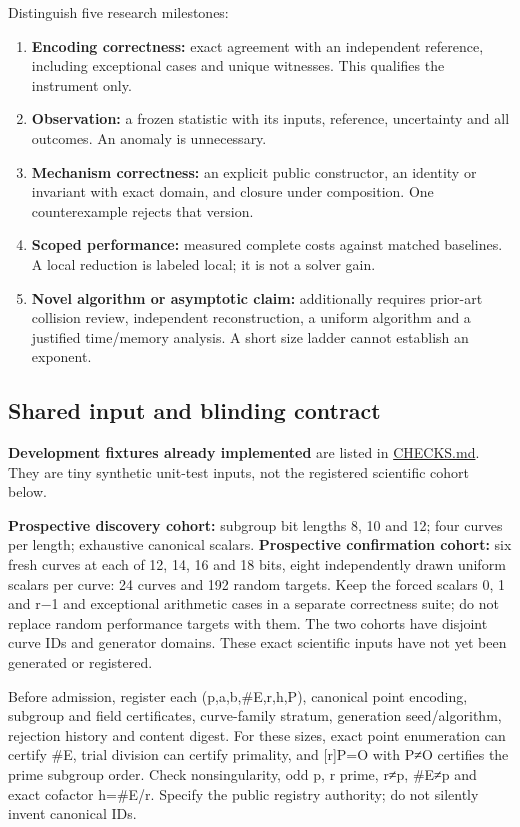 \documentclass[
  10pt,
]{article}
\providecommand{\tightlist}{%
  \setlength{\itemsep}{0pt}\setlength{\parskip}{0pt}}
\begin{document}
Distinguish five research milestones:

\begin{enumerate}
\def\labelenumi{\arabic{enumi}.}
\tightlist
\item
  \textbf{Encoding correctness:} exact agreement with an independent
  reference, including exceptional cases and unique witnesses. This
  qualifies the instrument only.
\item
  \textbf{Observation:} a frozen statistic with its inputs, reference,
  uncertainty and all outcomes. An anomaly is unnecessary.
\item
  \textbf{Mechanism correctness:} an explicit public constructor, an
  identity or invariant with exact domain, and closure under
  composition. One counterexample rejects that version.
\item
  \textbf{Scoped performance:} measured complete costs against matched
  baselines. A local reduction is labeled local; it is not a solver
  gain.
\item
  \textbf{Novel algorithm or asymptotic claim:} additionally requires
  prior-art collision review, independent reconstruction, a uniform
  algorithm and a justified time/memory analysis. A short size ladder
  cannot establish an exponent.
\end{enumerate}

\subsection{Shared input and blinding
contract}\label{shared-input-and-blinding-contract}

\textbf{Development fixtures already implemented} are listed in
\url{CHECKS.md}. They are tiny synthetic unit-test inputs, not the
registered scientific cohort below.

\textbf{Prospective discovery cohort:} subgroup bit lengths 8, 10 and
12; four curves per length; exhaustive canonical scalars.
\textbf{Prospective confirmation cohort:} six fresh curves at each of
12, 14, 16 and 18 bits, eight independently drawn uniform scalars per
curve: 24 curves and 192 random targets. Keep the forced scalars 0, 1
and r−1 and exceptional arithmetic cases in a separate correctness
suite; do not replace random performance targets with them. The two
cohorts have disjoint curve IDs and generator domains. These exact
scientific inputs have not yet been generated or registered.

Before admission, register each (p,a,b,\#E,r,h,P), canonical point
encoding, subgroup and field certificates, curve-family stratum,
generation seed/algorithm, rejection history and content digest. For
these sizes, exact point enumeration can certify \#E, trial division can
certify primality, and {[}r{]}P=O with P≠O certifies the prime subgroup
order. Check nonsingularity, odd p, r prime, r≠p, \#E≠p and exact
cofactor h=\#E/r. Specify the public registry authority; do not silently
invent canonical IDs.
\end{document}
